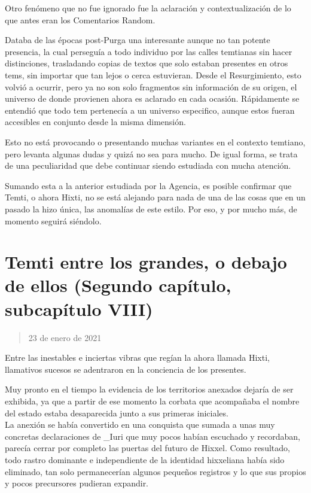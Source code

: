 \documentclass[
  spanish,
]{book}
\begin{document}
Otro fenómeno que no fue ignorado fue la aclaración y contextualización de lo que antes eran los Comentarios Random.

Databa de las épocas post-Purga una interesante aunque no tan potente presencia, la cual perseguía a todo individuo por las calles temtianas sin hacer distinciones, trasladando copias de textos que solo estaban presentes en otros tems, sin importar que tan lejos o cerca estuvieran. Desde el Resurgimiento, esto volvió a ocurrir, pero ya no son solo fragmentos sin información de su origen, el universo de donde provienen ahora es aclarado en cada ocasión. Rápidamente se entendió que todo tem pertenecía a un universo especifico, aunque estos fueran accesibles en conjunto desde la misma dimensión.

Esto no está provocando o presentando muchas variantes en el contexto temtiano, pero levanta algunas dudas y quizá no sea para mucho. De igual forma, se trata de una peculiaridad que debe continuar siendo estudiada con mucha atención.

Sumando esta a la anterior estudiada por la Agencia, es posible confirmar que Temti, o ahora Hixti, no se está alejando para nada de una de las cosas que en un pasado la hizo única, las anomalías de este estilo. Por eso, y por mucho más, de momento seguirá siéndolo.

\hypertarget{temti-entre-los-grandes-o-debajo-de-ellos-segundo-capuxedtulo-subcapuxedtulo-viii}{%
\section{Temti entre los grandes, o debajo de ellos (Segundo capítulo, subcapítulo VIII)}\label{temti-entre-los-grandes-o-debajo-de-ellos-segundo-capuxedtulo-subcapuxedtulo-viii}}

\begin{quote}
23 de enero de 2021
\end{quote}

Entre las inestables e inciertas vibras que regían la ahora llamada Hixti, llamativos sucesos se adentraron en la conciencia de los presentes.

Muy pronto en el tiempo la evidencia de los territorios anexados dejaría de ser exhibida, ya que a partir de ese momento la corbata que acompañaba el nombre del estado estaba desaparecida junto a sus primeras iniciales.\\
La anexión se había convertido en una conquista que sumada a unas muy concretas declaraciones de \_Iuri que muy pocos habían escuchado y recordaban, parecía cerrar por completo las puertas del futuro de Hixxel. Como resultado, todo rastro dominante e independiente de la identidad hixxeliana había sido eliminado, tan solo permanecerían algunos pequeños registros y lo que sus propios y pocos precursores pudieran expandir.
\end{document}
